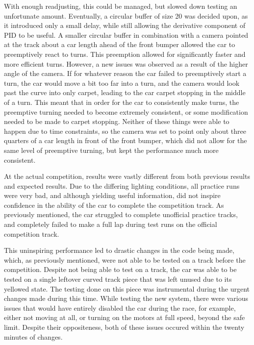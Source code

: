 \documentclass[conference]{IEEEtran}
\begin{document}
    With enough readjusting, this could be managed, but slowed down testing an unfortunate amount. Eventually, a circular buffer of size 20 was decided upon, as it introduced only a small
    delay, while still allowing the derivative component of PID to be useful. A smaller circular buffer in combination with a camera pointed at the track about a car length ahead of the
    front bumper allowed the car to preemptively react to turns.
    This preemption allowed for significantly faster and more efficient turns.
    However, a new issues was observed as a result of the higher angle of the camera.
    If for whatever reason the car failed to preemptively start a turn, the car would move a bit too far into a turn, and the camera would look past the curve into only carpet, leading 
    to the car carpet stopping in the middle of a turn.
    This meant that in order for the car to consistently make turns, the preemptive turning needed to become extremely consistent, or some modification needed to be made to carpet stopping.
    Neither of these things were able to happen due to time constraints, so the camera was set to point only about three quarters of a car length in front of the front bumper, which did not
    allow for the same level of preemptive turning, but kept the performance much more consistent.

    At the actual competition, results were vastly different from both previous results and expected results. Due to the differing lighting conditions, all practice runs were very bad,
    and although yielding useful information, did not inspire confidence in the ability of the car to complete the competition track. As previously mentioned, the car struggled to
    complete unofficial practice tracks, and completely failed to make a full lap during test runs on the official competition track.
    
    This uninspiring performance led to drastic changes in the code being made, which, as previously mentioned, were not able to be tested on a track before the competition. Despite not being
    able to test on a track, the car was able to be tested on a single leftover curved track piece that was left unused due to its yellowed state. The testing done on this piece was instrumental
    during the urgent changes made during this time. While testing the new system, there were various issues that would have entirely disabled the car during the race, for example, either not moving
    at all, or turning on the motors at full speed, beyond the safe limit.
    Despite their oppositeness, both of these issues occured within the twenty minutes of changes.
\end{document}
